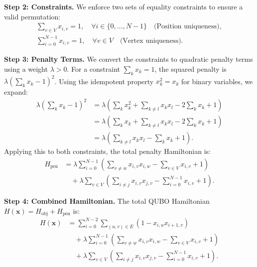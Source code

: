 \documentclass[12pt]{article}
\begin{document}
\textbf{Step 2: Constraints.}
We enforce two sets of equality constraints to ensure a valid permutation:
\begin{align}
\sum_{v \in V} x_{i,v} = 1, \quad \forall i \in \{0, \dots, N-1\} \quad \text{(Position uniqueness)}, \label{eq:pos_constraint} \\
\sum_{i=0}^{N-1} x_{i,v} = 1, \quad \forall v \in V \quad \text{(Vertex uniqueness)}. \label{eq:vert_constraint}
\end{align}

\textbf{Step 3: Penalty Terms.}
We convert the constraints to quadratic penalty terms using a weight $\lambda > 0$. For a constraint $\sum_k x_k = 1$, the squared penalty is $\lambda (\sum_k x_k - 1)^2$. Using the idempotent property $x_k^2 = x_k$ for binary variables, we expand:
\begin{align}
\lambda \left( \sum_k x_k - 1 \right)^2 &= \lambda \left( \sum_k x_k^2 + \sum_{k \neq l} x_k x_l - 2 \sum_k x_k + 1 \right) \nonumber \\
&= \lambda \left( \sum_k x_k + \sum_{k \neq l} x_k x_l - 2 \sum_k x_k + 1 \right) \nonumber \\
&= \lambda \left( \sum_{k \neq l} x_k x_l - \sum_k x_k + 1 \right).
\end{align}
Applying this to both constraints, the total penalty Hamiltonian is:
\begin{align}
H_{\text{pen}} &= \lambda \sum_{i=0}^{N-1} \left( \sum_{v \neq w} x_{i,v} x_{i,w} - \sum_{v \in V} x_{i,v} + 1 \right) \nonumber \\
&\quad + \lambda \sum_{v \in V} \left( \sum_{i \neq j} x_{i,v} x_{j,v} - \sum_{i=0}^{N-1} x_{i,v} + 1 \right).
\end{align}

\textbf{Step 4: Combined Hamiltonian.}
The total QUBO Hamiltonian $H(\mathbf{x}) = H_{\text{obj}} + H_{\text{pen}}$ is:
\begin{align}
H(\mathbf{x}) &= \sum_{i=0}^{N-2} \sum_{(u,v) \in E} \left( 1 - x_{i,u} x_{i+1,v} \right) \nonumber \\
&\quad + \lambda \sum_{i=0}^{N-1} \left( \sum_{v \neq w} x_{i,v} x_{i,w} - \sum_{v \in V} x_{i,v} + 1 \right) \nonumber \\
&\quad + \lambda \sum_{v \in V} \left( \sum_{i \neq j} x_{i,v} x_{j,v} - \sum_{i=0}^{N-1} x_{i,v} + 1 \right).
\end{align}
\end{document}
